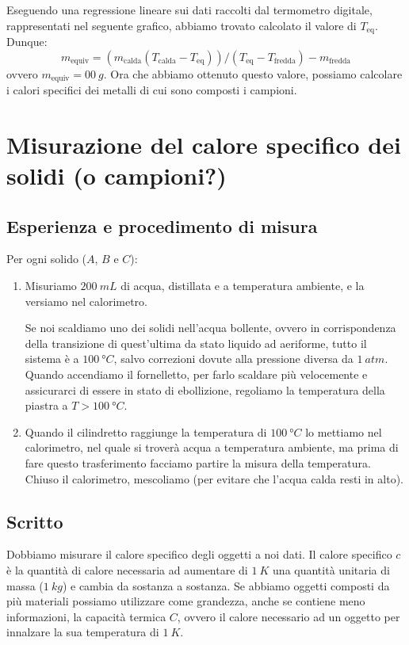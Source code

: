\documentclass{article}
\begin{document}
Eseguendo una regressione lineare sui dati raccolti dal termometro digitale, rappresentati nel
seguente grafico, abbiamo trovato calcolato il valore di $T_\text{eq}$. Dunque:
    \[
        m_\text{equiv} = (m_\text{calda} (T_\text{calda}-T_\text{eq}))/(T_\text{eq}-T_\text{fredda}) - m_\text{fredda}
    \]
ovvero $m_\text{equiv} = \qty{00}{g}$. Ora che abbiamo ottenuto questo valore,
possiamo calcolare i calori specifici dei metalli di cui sono composti i campioni.



\section{Misurazione del calore specifico dei solidi (o campioni?)}
    
\subsection{Esperienza e procedimento di misura}
Per ogni solido ($A$, $B$ e $C$):

\begin{enumerate}
    \item
        Misuriamo $\qty{200}{mL}$ di acqua, distillata e a temperatura ambiente,
        e la versiamo nel calorimetro.
        
        Se noi scaldiamo uno dei solidi
        nell'acqua bollente, ovvero in corrispondenza
        della transizione di quest'ultima da stato liquido ad aeriforme, tutto il sistema
        è a $\qty{100}{\degree C}$, salvo correzioni dovute alla pressione diversa da $\qty{1}{atm}$.
        Quando accendiamo il fornelletto, per farlo scaldare più velocemente e assicurarci
        di essere in stato di ebollizione, regoliamo la temperatura della piastra a
        $T>\qty{100}{\degree C}$.
    \item
        Quando il cilindretto raggiunge la temperatura di $\qty{100}{\degree C}$ lo mettiamo nel calorimetro,
        nel quale si troverà acqua a temperatura ambiente, ma prima di fare questo
        trasferimento facciamo partire la misura della temperatura. Chiuso il calorimetro,
        mescoliamo (per evitare che l'acqua calda resti in alto).
\end{enumerate}









\subsection{Scritto}
    Dobbiamo misurare il calore specifico degli oggetti a noi dati. Il calore
    specifico $c$ è la quantità di calore necessaria ad aumentare di $\qty{1}{K}$ una
    quantità unitaria di massa ($\qty{1}{kg}$) e cambia da sostanza a sostanza.
    Se abbiamo oggetti composti da più materiali possiamo utilizzare come grandezza,
    anche se contiene meno informazioni, la capacità termica $C$, ovvero il calore
    necessario ad un oggetto per innalzare la sua temperatura di $\qty{1}{K}$.
\end{document}
